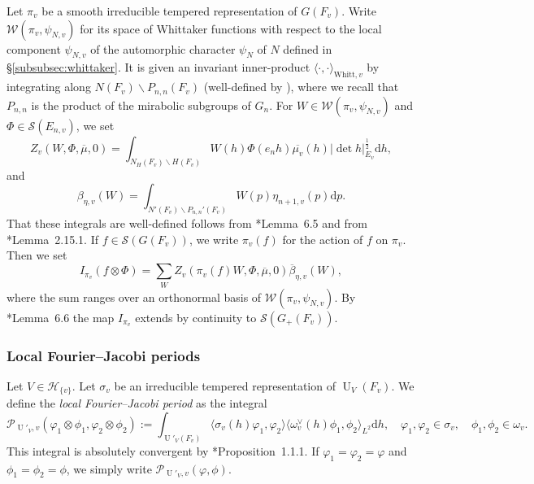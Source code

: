 \documentclass[letterpaper,11pt]{amsart}
\newcommand{\cH}{\mathcal{H}}
\newcommand{\cP}{\mathcal{P}}
\newcommand{\cS}{\mathcal{S}}
\newcommand{\cW}{\mathcal{W}}
\newcommand{\rd}{\mathrm{d}}
\newcommand{\<}{\negthickspace}
\newcommand{\valP}[1]{\left|#1\right|}
\DeclareMathOperator{\U}{U}
\theoremstyle{definition}
\theoremstyle{plain}
\theoremstyle{remark}
\numberwithin{equation}{section}
\begin{document}
Let $\pi_v$ be a smooth irreducible tempered representation of $G(F_v)$. Write $\cW(\pi_v,\psi_{N,v})$ for its space of Whittaker functions with respect to the local component $\psi_{N,v}$ of the automorphic character $\psi_N$ of $N$ defined in \S\ref{subsubsec:whittaker}. It is given an invariant inner-product $\langle \cdot,\cdot \rangle_{\mathrm{Whitt},v}$ by integrating along $N(F_v) \backslash P_{n,n}(F_v)$ (well-defined by \cite{Jac2}), where we recall that $P_{n,n}$ is the product of the mirabolic subgroups of $G_n$. For $W \in \cW(\pi_v,\psi_{N,v})$ and $\Phi \in \cS(E_{n,v})$, we set
\begin{equation}    \label{eq:local_RS}
    Z_v(W, \Phi,\overline{\mu},0) = \int_{N_H(F_v) \backslash H(F_v)}
    W(h) \Phi(e_n h) \overline{\mu_v}(h)
    \valP{\det h}_{E_v}^{\frac{1}{2}} \rd h,
    \end{equation}
and 
\begin{equation}    \label{eq:local_FR}
    \beta_{\eta,v}(W) = \int_{N'(F_v) \backslash P_{n,n}'(F_v)} W(p) \eta_{n+1,v}(p) \rd p.
\end{equation}
That these integrals are well-defined follows from \cite{BLX2}*{Lemma~6.5} and from \cite{BP1}*{Lemma~2.15.1}. If $f \in \cS(G(F_v))$, we write $\pi_v(f)$ for the action of $f$ on $\pi_v$. Then we set
\begin{equation}
    \label{eq:local_spheri_char_gln}
    I_{\pi_v}(f\otimes \Phi)=\sum_W Z_v(\pi_v(f) W, \Phi,\overline{\mu},0) \overline{\beta}_{\eta,v}(W),
\end{equation}
where the sum ranges over an orthonormal basis of $\cW(\pi_v,\psi_{N,v})$. By \cite{BLX2}*{Lemma~6.6} the map $I_{\pi_v}$ extends by continuity to $\cS(G_+(F_v))$.

\subsubsection{Local Fourier--Jacobi periods} \label{subsubsec:local_FJ} Let $V \in \cH_{\{v\}}$. Let $\sigma_v$ be an irreducible tempered representation of $\U_V(F_v)$. We define the \emph{local Fourier--Jacobi period} as the integral
\begin{equation*}
    \cP_{\U'_V,v}(\varphi_1 \otimes \phi_1,\varphi_2 \otimes \phi_2):=\int_{\U'_V(F_v)} \langle \sigma_v(h) \varphi_1,\varphi_2 \rangle \langle \omega_v^\vee(h) \phi_1,\phi_2 \rangle_{L^2} \rd h, \quad \varphi_1, \varphi_2 \in \sigma_v, \quad \phi_1, \phi_2 \in \omega_v.
\end{equation*}
This integral is absolutely convergent by \cite{Xue2}*{Proposition~1.1.1}. If $\varphi_1=\varphi_2=\varphi$ and $\phi_1=\phi_2=\phi$, we simply write $\cP_{\U'_V,v}(\varphi,\phi)$.
\end{document}
